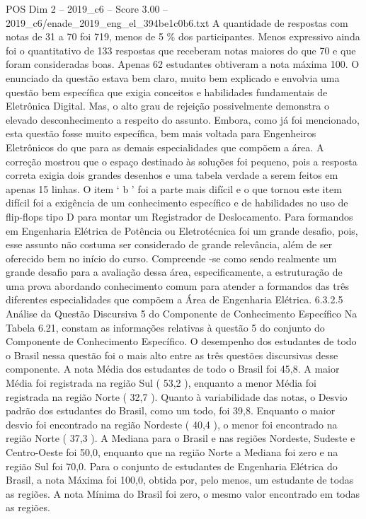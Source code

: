\begin{textsample}{POS Dim 2 – 2019\_c6 – Score 3.00 – 2019\_c6/enade\_2019\_eng\_el\_394be1c0b6.txt}
A quantidade de respostas com notas de 31 a 70 foi 719, menos de 5 \% dos participantes.
Menos expressivo ainda foi o quantitativo de 133 respostas que receberam notas maiores do que 70 e que foram consideradas boas.
Apenas 62 estudantes obtiveram a nota máxima 100.
O enunciado da questão estava bem claro, muito bem explicado e envolvia uma questão bem específica que exigia conceitos e habilidades fundamentais de Eletrônica Digital.
Mas, o alto grau de rejeição possivelmente demonstra o elevado desconhecimento a respeito do assunto.
Embora, como já foi mencionado, esta questão fosse muito específica, bem mais voltada para Engenheiros Eletrônicos do que para as demais especialidades que compõem a área.
A correção mostrou que o espaço destinado às soluções foi pequeno, pois a resposta correta exigia dois grandes desenhos e uma tabela verdade a serem feitos em apenas 15 linhas.
O item ‘ b ’ foi a parte mais difícil e o que tornou este item difícil foi a exigência de um conhecimento específico e de habilidades no uso de flip-flops tipo D para montar um Registrador de Deslocamento.
Para formandos em Engenharia Elétrica de Potência ou Eletrotécnica foi um grande desafio, pois, esse assunto não costuma ser considerado de grande relevância, além de ser oferecido bem no início do curso.
Compreende -se como sendo realmente um grande desafio para a avaliação dessa área, especificamente, a estruturação de uma prova abordando conhecimento comum para atender a formandos das três diferentes especialidades que compõem a Área de Engenharia Elétrica. 6.3.2.5 Análise da Questão Discursiva 5 do Componente de Conhecimento Específico Na Tabela 6.21, constam as informações relativas à questão 5 do conjunto do Componente de Conhecimento Específico.
O desempenho dos estudantes de todo o Brasil nessa questão foi o mais alto entre as três questões discursivas desse componente.
A nota Média dos estudantes de todo o Brasil foi 45,8.
A maior Média foi registrada na região Sul ( 53,2 ), enquanto a menor Média foi registrada na região Norte ( 32,7 ).
Quanto à variabilidade das notas, o Desvio padrão dos estudantes do Brasil, como um todo, foi 39,8.
Enquanto o maior desvio foi encontrado na região Nordeste ( 40,4 ), o menor foi encontrado na região Norte ( 37,3 ).
A Mediana para o Brasil e nas regiões Nordeste, Sudeste e Centro-Oeste foi 50,0, enquanto que na região Norte a Mediana foi zero e na região Sul foi 70,0.
Para o conjunto de estudantes de Engenharia Elétrica do Brasil, a nota Máxima foi 100,0, obtida por, pelo menos, um estudante de todas as regiões.
A nota Mínima do Brasil foi zero, o mesmo valor encontrado em todas as regiões.

\end{textsample}
